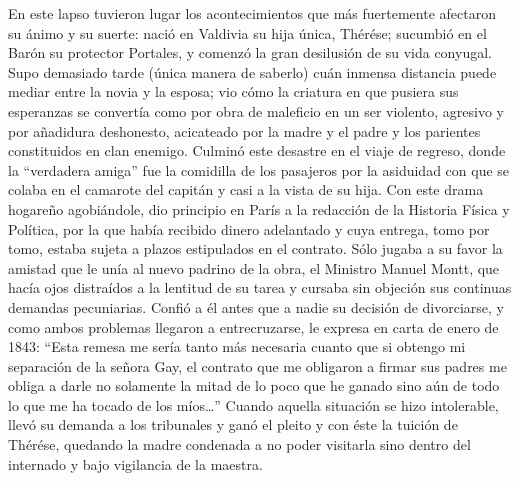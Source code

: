 \documentclass[10pt,twoside,openright]{memoir}
\begin{document}
En este lapso tuvieron lugar los acontecimientos que más fuertemente
afectaron su ánimo y su suerte: nació en Valdivia su hija única,
Thérése; sucumbió en el Barón su protector Portales, y comenzó la gran
desilusión de su vida conyugal. Supo demasiado tarde (única manera de
saberlo) cuán inmensa distancia puede mediar entre la novia y la esposa;
vio cómo la criatura en que pusiera sus esperanzas se convertía como por
obra de maleficio en un ser violento, agresivo y por añadidura
deshonesto, acicateado por la madre y el padre y los parientes
constituidos en clan enemigo. Culminó este desastre en el viaje de
regreso, donde la ``verdadera amiga'' fue la comidilla de los pasajeros
por la asiduidad con que se colaba en el camarote del capitán y casi a
la vista de su hija. Con este drama hogareño agobiándole, dio principio
en París a la redacción de la Historia Física y Política, por la que
había recibido dinero adelantado y cuya entrega, tomo por tomo, estaba
sujeta a plazos estipulados en el contrato. Sólo jugaba a su favor la
amistad que le unía al nuevo padrino de la obra, el Ministro Manuel
Montt, que hacía ojos distraídos a la lentitud de su tarea y cursaba sin
objeción sus continuas demandas pecuniarias. Confió a él antes que a
nadie su decisión de divorciarse, y como ambos problemas llegaron a
entrecruzarse, le expresa en carta de enero de 1843: ``Esta remesa me
sería tanto más necesaria cuanto que si obtengo mi separación de la
señora Gay, el contrato que me obligaron a firmar sus padres me obliga a
darle no solamente la mitad de lo poco que he ganado sino aún de todo lo
que me ha tocado de los míos\ldots'' Cuando aquella situación se hizo
intolerable, llevó su demanda a los tribunales y ganó el pleito y con
éste la tuición de Thérése, quedando la madre condenada a no poder
visitarla sino dentro del internado y bajo vigilancia de la maestra.
\end{document}
